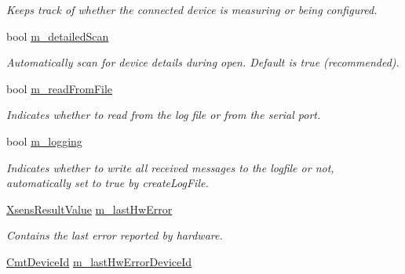 \begin{DoxyCompactItemize}
\begin{DoxyCompactList}\small\item\em \-Keeps track of whether the connected device is measuring or being configured. \end{DoxyCompactList}\item 
\hypertarget{classxsens_1_1Cmt3_a391d266a18b8a853fc1c0e121445480c}{bool \hyperlink{classxsens_1_1Cmt3_a391d266a18b8a853fc1c0e121445480c}{m\-\_\-detailed\-Scan}}\label{classxsens_1_1Cmt3_a391d266a18b8a853fc1c0e121445480c}

\begin{DoxyCompactList}\small\item\em \-Automatically scan for device details during open. \-Default is true (recommended). \end{DoxyCompactList}\item 
\hypertarget{classxsens_1_1Cmt3_a410e4b8b27f99b1fc14483180098737e}{bool \hyperlink{classxsens_1_1Cmt3_a410e4b8b27f99b1fc14483180098737e}{m\-\_\-read\-From\-File}}\label{classxsens_1_1Cmt3_a410e4b8b27f99b1fc14483180098737e}

\begin{DoxyCompactList}\small\item\em \-Indicates whether to read from the log file or from the serial port. \end{DoxyCompactList}\item 
\hypertarget{classxsens_1_1Cmt3_ad3ac804c0bdae145e2b89715de94795a}{bool \hyperlink{classxsens_1_1Cmt3_ad3ac804c0bdae145e2b89715de94795a}{m\-\_\-logging}}\label{classxsens_1_1Cmt3_ad3ac804c0bdae145e2b89715de94795a}

\begin{DoxyCompactList}\small\item\em \-Indicates whether to write all received messages to the logfile or not, automatically set to true by create\-Log\-File. \end{DoxyCompactList}\item 
\hypertarget{classxsens_1_1Cmt3_a7a15d2f224dc9c4c88ef7bbef3d5267a}{\hyperlink{group__enums_ga822a2260a20af524029eef9e9a51ff6f}{\-Xsens\-Result\-Value} \hyperlink{classxsens_1_1Cmt3_a7a15d2f224dc9c4c88ef7bbef3d5267a}{m\-\_\-last\-Hw\-Error}}\label{classxsens_1_1Cmt3_a7a15d2f224dc9c4c88ef7bbef3d5267a}

\begin{DoxyCompactList}\small\item\em \-Contains the last error reported by hardware. \end{DoxyCompactList}\item 
\hypertarget{classxsens_1_1Cmt3_abf1016963198b9d32c1908f5c0056775}{\hyperlink{cmtdef_8h_a2e3b6a17360828d440ee848959918af2}{\-Cmt\-Device\-Id} \hyperlink{classxsens_1_1Cmt3_abf1016963198b9d32c1908f5c0056775}{m\-\_\-last\-Hw\-Error\-Device\-Id}}\label{classxsens_1_1Cmt3_abf1016963198b9d32c1908f5c0056775}


\end{DoxyCompactItemize}
